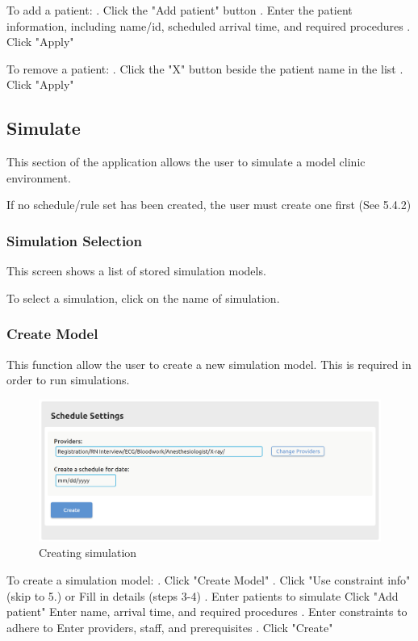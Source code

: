 \documentclass[12pt]{article}
\begin{document}
To add a patient:
. Click the "Add patient" button
. Enter the patient information, including name/id, scheduled arrival time, and required procedures
. Click "Apply"
\medbreak

To remove a patient:
. Click the "X" button beside the patient name in the list
. Click "Apply"

\subsection{Simulate}
This section of the application allows the user to simulate a model clinic environment.
\medbreak

If no schedule/rule set has been created, the user must create one first (See 5.4.2)

\subsubsection{Simulation Selection}
This screen shows a list of stored simulation models.
\medbreak

To select a simulation, click on the name of simulation.

\subsubsection{Create Model}
This function allow the user to create a new simulation model. This is required in order to run simulations.
\medbreak

\begin{figure}[h!]
\caption{Creating simulation}
\centering
\includegraphics[width=\textwidth]{simsetting}
\end{figure}

To create a simulation model:
. Click "Create Model"
. Click "Use constraint info" (skip to 5.) or Fill in details (steps 3-4)
. Enter patients to simulate
 Click "Add patient"
 Enter name, arrival time, and required procedures
. Enter constraints to adhere to
 Enter providers, staff, and prerequisites
. Click "Create"
\end{document}
